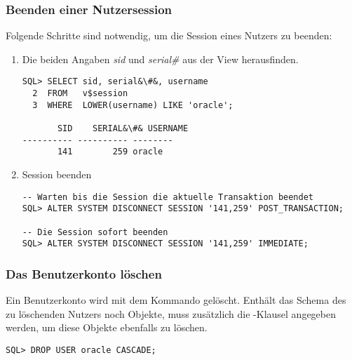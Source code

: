         \subsubsection{Beenden einer Nutzersession}
        \label{kill_user}
          Folgende Schritte sind notwendig, um die Session eines Nutzers zu beenden:
          \begin{enumerate}
            \item Die beiden Angaben \textit{sid} und \textit{serial\#} aus der View  herausfinden.
            \begin{lstlisting}[caption={Abfragen von sid und
            serial\#},label=admin204,language=oracle_sql]
SQL> SELECT sid, serial&\#&, username
  2  FROM   v$session
  3  WHERE  LOWER(username) LIKE 'oracle';

       SID    SERIAL&\#& USERNAME
---------- ---------- --------
       141        259 oracle
            \end{lstlisting}
            \item Session beenden
            \begin{lstlisting}[caption={Beenden einer
            Nutzersession},label=admin205,language=oracle_sql]
-- Warten bis die Session die aktuelle Transaktion beendet
SQL> ALTER SYSTEM DISCONNECT SESSION '141,259' POST_TRANSACTION;

-- Die Session sofort beenden
SQL> ALTER SYSTEM DISCONNECT SESSION '141,259' IMMEDIATE;
            \end{lstlisting}
          \end{enumerate}
          \begin{literaturinternet}
            \item \cite{sthref938}
          \end{literaturinternet}
        \subsubsection{Das Benutzerkonto löschen}
          Ein Benutzerkonto wird mit dem Kommando  gelöscht. Enthält das Schema des zu löschenden Nutzers noch Objekte, muss zusätzlich die -Klausel angegeben werden, um diese Objekte ebenfalls zu löschen.
          \begin{lstlisting}[caption={Das DROP USER
          Statement},label=admin206,language=oracle_sql]
SQL> DROP USER oracle CASCADE;
          \end{lstlisting}
          \begin{literaturinternet}
            \item \cite{DBSEG99791}
        \end{literaturinternet}
